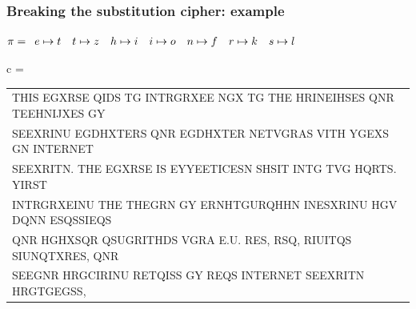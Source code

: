 \documentclass[aspectratio=169, lualatex, 10pt,dvipsnames,svgnames]{beamer} %
\def\enbleu#1{\textcolor{bleu}{#1}}
\def\enrouge#1{\textcolor{rouge}{#1}}
\begin{document}
\begin{frame}
  \frametitle{Breaking the substitution cipher: example}
  
    \enrouge{
    \tiny{$\pi=
      \begin{array}[t]{l}
      e\mapsto t\quad t\mapsto z \quad h\mapsto i\quad i\mapsto o\quad n\mapsto f\quad r\mapsto k\quad s\mapsto l\ 
      \end{array}
      $}}
  \vspace{0.25cm}

  \color{vert}
  \tiny{c =
    \begin{tabular}[t]{l}
      \enbleu{T}\enbleu{H}\enbleu{I}\enbleu{S} EGX\enbleu{R}\enbleu{S}\enbleu{E} Q\enbleu{I}D\enbleu{S} \enbleu{T}G \enbleu{I}\enbleu{N}\enbleu{T}\enbleu{R}GRXE\enbleu{E} NGX \enbleu{T}G \enbleu{T}\enbleu{H}\enbleu{E} H\enbleu{R}\enbleu{I}\enbleu{N}E\enbleu{I}HS\enbleu{E}\enbleu{S} Q\enbleu{N}R \enbleu{T}\enbleu{E}E\enbleu{H}\enbleu{N}\enbleu{I}JX\enbleu{E}\enbleu{S} GY \\
      \enbleu{S}\enbleu{E}EX\enbleu{R}\enbleu{I}\enbleu{N}U EGDHX\enbleu{T}\enbleu{E}\enbleu{R}\enbleu{S} Q\enbleu{N}R EGDHX\enbleu{T}\enbleu{E}\enbleu{R} \enbleu{N}\enbleu{E}\enbleu{T}VG\enbleu{R}A\enbleu{S} V\enbleu{I}\enbleu{T}\enbleu{H} YGEX\enbleu{S} G\enbleu{N} \enbleu{I}\enbleu{N}\enbleu{T}\enbleu{E}\enbleu{R}\enbleu{N}\enbleu{E}\enbleu{T} \\
      \enbleu{S}\enbleu{E}EX\enbleu{R}\enbleu{I}\enbleu{T}N. \enbleu{T}\enbleu{H}\enbleu{E} EGX\enbleu{R}\enbleu{S}\enbleu{E} \enbleu{I}\enbleu{S} \enbleu{E}YY\enbleu{E}E\enbleu{T}\enbleu{I}C\enbleu{E}SN \enbleu{S}HS\enbleu{I}\enbleu{T} \enbleu{I}\enbleu{N}\enbleu{T}G \enbleu{T}VG HQ\enbleu{R}\enbleu{T}\enbleu{S}. Y\enbleu{I}\enbleu{R}\enbleu{S}\enbleu{T} \\
      \enbleu{I}\enbleu{N}\enbleu{T}\enbleu{R}GRXE\enbleu{I}\enbleu{N}U \enbleu{T}\enbleu{H}\enbleu{E} \enbleu{T}\enbleu{H}\enbleu{E}G\enbleu{R}N GY E\enbleu{R}NH\enbleu{T}GU\enbleu{R}QH\enbleu{H}N \enbleu{I}\enbleu{N}ESXR\enbleu{I}\enbleu{N}U \enbleu{H}GV DQ\enbleu{N}N ESQ\enbleu{S}\enbleu{S}\enbleu{I}EQS \\
      Q\enbleu{N}R HGHXSQ\enbleu{R} QSUG\enbleu{R}\enbleu{I}\enbleu{T}\enbleu{H}D\enbleu{S} VG\enbleu{R}A \enbleu{E}.U. R\enbleu{E}\enbleu{S}, \enbleu{R}\enbleu{S}Q, R\enbleu{I}U\enbleu{I}\enbleu{T}QS \enbleu{S}\enbleu{I}U\enbleu{N}Q\enbleu{T}X\enbleu{R}\enbleu{E}\enbleu{S}, Q\enbleu{N}R \\
      \enbleu{S}\enbleu{E}EG\enbleu{N}R H\enbleu{R}GC\enbleu{I}R\enbleu{I}\enbleu{N}U R\enbleu{E}\enbleu{T}Q\enbleu{I}S\enbleu{S} GY \enbleu{R}\enbleu{E}QS \enbleu{I}\enbleu{N}\enbleu{T}\enbleu{E}\enbleu{R}\enbleu{N}\enbleu{E}\enbleu{T} \enbleu{S}\enbleu{E}EX\enbleu{R}\enbleu{I}\enbleu{T}N H\enbleu{R}G\enbleu{T}GEGS\enbleu{S}, \\

\end{tabular}}
\end{frame}
\end{document}
